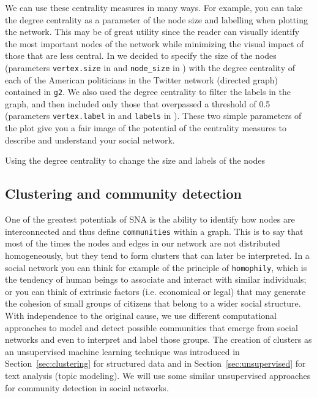 We can use these centrality measures in many ways. For example, you can take the degree centrality as a parameter of the node size and labelling when plotting the network. This may be of great utility since the reader can visually identify the most important nodes of the network while minimizing the visual impact of those that are less central. In  we decided to specify the size of the nodes (parameters \verb|vertex.size| in  and \verb|node_size| in ) with the degree centrality of each of the American politicians in the Twitter network (directed graph) contained in \texttt{g2}. We also used the degree centrality to filter the labels in the graph, and then included only those that overpassed a threshold of 0.5 (parameters \verb|vertex.label| in  and \verb|labels| in ). These two simple parameters of the plot give you a fair image of the potential of the centrality measures to describe and understand your social network.

\begin{ccsexample}
  \caption{Using the degree centrality to change the size and labels of the nodes}
  \label{ex:plotsize}
\end{ccsexample}

\subsection{Clustering and community detection}

One of the greatest potentials of SNA is the ability to identify how nodes are interconnected and thus define \texttt{communities} within a graph. This is to say that most of the times the nodes and edges in our network are not distributed homogeneously, but they tend to form clusters that can  later be interpreted. In a social network you can think for example of the principle of \texttt{homophily}, which is the tendency of human beings to associate and interact with similar individuals; or you can think of extrinsic factors (i.e. economical or legal) that may generate the cohesion of small groups of citizens that belong to a wider social structure. With independence to the original cause, we use different computational approaches to model and detect possible communities that emerge from social networks and even to interpret and label those groups. The creation of clusters as an unsupervised machine learning technique was introduced in Section~\ref{sec:clustering} for structured data and in Section~\ref{sec:unsupervised} for text analysis (topic modeling). We will use some similar unsupervised approaches for community detection in social networks.


